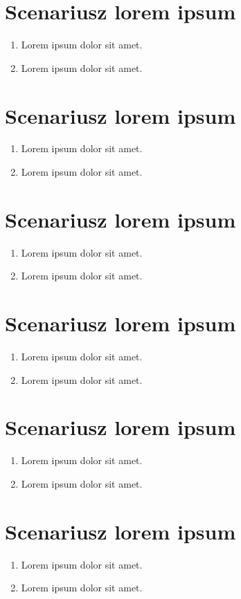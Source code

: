 \documentclass[11pt,a4paper]{article}
\begin{document}
\section{Scenariusz lorem ipsum}
\begin{enumerate}
\item{Lorem ipsum dolor sit amet.}
\item{Lorem ipsum dolor sit amet.}
\end{enumerate}

\section{Scenariusz lorem ipsum}
\begin{enumerate}
\item{Lorem ipsum dolor sit amet.}
\item{Lorem ipsum dolor sit amet.}
\end{enumerate}

\section{Scenariusz lorem ipsum}
\begin{enumerate}
\item{Lorem ipsum dolor sit amet.}
\item{Lorem ipsum dolor sit amet.}
\end{enumerate}

\section{Scenariusz lorem ipsum}
\begin{enumerate}
\item{Lorem ipsum dolor sit amet.}
\item{Lorem ipsum dolor sit amet.}
\end{enumerate}

\section{Scenariusz lorem ipsum}
\begin{enumerate}
\item{Lorem ipsum dolor sit amet.}
\item{Lorem ipsum dolor sit amet.}
\end{enumerate}

\section{Scenariusz lorem ipsum}
\begin{enumerate}
\item{Lorem ipsum dolor sit amet.}
\item{Lorem ipsum dolor sit amet.}
\end{enumerate}
\end{document}
